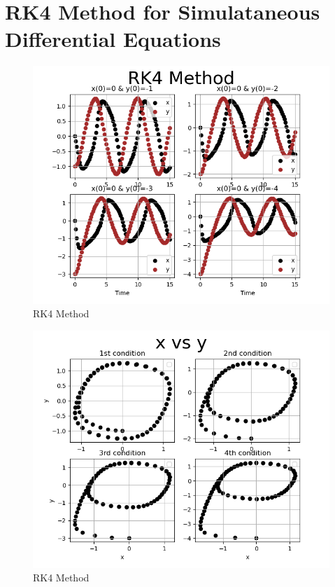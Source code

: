 \documentclass{article}
\begin{document}
\section{RK4 Method for Simulataneous Differential Equations}


\newpage

\begin{figure}[h]
    \centering
    \includegraphics[width=14cm,height=12cm \textwidth]{rk4/Figure_1.png}
\caption{RK4 Method}
\end{figure}
\begin{figure}[h]
    \centering
    \includegraphics[width=14cm,height=12cm \textwidth]{rk4/Figure_2.png}
\caption{RK4 Method}
\end{figure}
\end{document}
